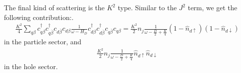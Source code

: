 The final kind of scattering is the \(K^2\) type. Similar to the \(J^2\) term, we get the following contribution:. 
\begin{equation}\begin{aligned}
	\label{ren_ed_Kpp}
	\frac{K^2}{4}\sum_{q\beta}c^\dagger_{q\beta}c^\dagger_{q\overline\beta}c_{d\overline\beta}c_{d\beta} \frac{1}{\omega - H_D}c^\dagger_{d\beta}c^\dagger_{d\overline\beta}c_{q\overline\beta}c_{q\beta} = \frac{K^2}{2} n_j\frac{1}{\omega - \frac{D}{2} + \frac{K}{4}} \left(1 - \hat n_{d \uparrow}\right) \left( 1 - \hat n_{d \downarrow} \right)
\end{aligned}\end{equation}
in the particle sector, and
\begin{equation}\begin{aligned}
	\label{ren_ed_Kph}
	\frac{K^2}{2} n_j\frac{1}{\omega - \frac{D}{2} + \frac{K}{4}} \hat n_{d\uparrow}\hat n_{d \downarrow}
\end{aligned}\end{equation}
in the hole sector.

